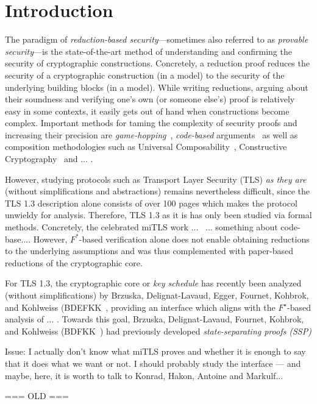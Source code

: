 \section{Introduction}
The paradigm of \emph{reduction-based security}---sometimes also referred to as \emph{provable security}---is the state-of-the-art method of understanding and confirming the security of cryptographic constructions. Concretely, a reduction proof reduces the security of a cryptographic construction (in a model) to the security of the underlying building blocks (in a model). While writing reductions, arguing about their soundness and verifying one's own (or someone else's) proof is relatively easy in some contexts, it easily gets out of hand when constructions become complex. Important methods for taming the complexity of security proofs and increasing their precision are \emph{game-hopping}~\cite{X}, \emph{code-based} arguments~\cite{X} as well as composition methodologies such as Universal Composability~\cite{X}, Constructive Cryptography~\cite{X} and ... .

However, studying protocols such as Transport Layer Security (TLS) \emph{as they are} (without simplifications and abstractions) remains nevertheless difficult, since the TLS 1.3 description alone consists of over 100 pages which makes the protocol unwieldy for analysis. Therefore, TLS 1.3 as it is has only been studied via formal methods. Concretely, the celebrated miTLS work ...~\cite{X} ... something about code-base.... However, $F^*$-based verification alone does not enable obtaining reductions to the underlying assumptions and was thus complemented with paper-based reductions of the cryptographic core.

For TLS 1.3, the cryptographic core or \emph{key schedule} has recently been analyzed (without simplifications) by Brzuska, Delignat-Lavaud, Egger, Fournet, Kohbrok, and Kohlweiss (BDEFKK~\cite{X}, providing an interface which aligns with the $F^\star$-based analysis of ... . Towards this goal, Brzuska, Delignat-Lavaud, Fournet, Kohbrok, and Kohlweiss (BDFKK~\cite{X}) had previously developed \emph{state-separating proofs (SSP)}

Issue: I actually don't know what miTLS proves and whether it is enough to say that it does what we want or not. I should probably study the interface --- and maybe, here, it is worth to talk to Konrad, Hakon, Antoine and Markulf...

=== OLD ===

